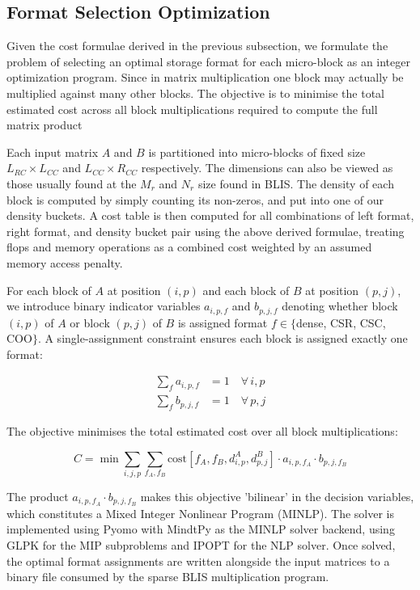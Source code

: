 \documentclass[sigconf, review, anonymous]{acmart}
\begin{document}
\subsection{Format Selection Optimization}

Given the cost formulae derived in the previous subsection, we formulate the problem of
selecting an optimal storage format for each micro-block as an integer optimization program.
Since in matrix multiplication one block may actually be multiplied against many other blocks.
The objective is to minimise the total estimated cost across all block multiplications
required to compute the full matrix product

Each input matrix $A$ and $B$ is partitioned into micro-blocks of fixed size
$L_{RC} \times L_{CC}$ and $L_{CC} \times R_{CC}$ respectively. The dimensions can also be viewed as those usually found at the $M_r$ and $N_r$ size found in BLIS. The density of each
block is computed by simply counting its non-zeros, and put into one of
our density buckets. A cost table is then computed for all combinations of left format,
right format, and density bucket pair using the above derived formulae, treating flops and
memory operations as a combined cost weighted by an assumed memory access penalty.

For each block of $A$ at position $(i, p)$ and each block of $B$ at position $(p, j)$,
we introduce binary indicator variables $a_{i,p,f}$ and $b_{p,j,f}$ denoting whether
block $(i,p)$ of $A$ or block $(p,j)$ of $B$ is assigned format $f \in \{$dense, CSR,
CSC, COO$\}$. A single-assignment constraint ensures each block is assigned exactly one
format:

\begin{align}
\sum_{f} a_{i,p,f} &= 1 \quad \forall\, i, p \\
\sum_{f} b_{p,j,f} &= 1 \quad \forall\, p, j
\end{align}

The objective minimises the total estimated cost over all block multiplications:

\begin{equation}
C = \min \sum_{i,j,p} \sum_{f_A, f_B}
    \text{cost}[f_A, f_B, d^A_{i,p}, d^B_{p,j}]
    \cdot a_{i,p,f_A} \cdot b_{p,j,f_B}
\end{equation}

The product $a_{i,p,f_A} \cdot b_{p,j,f_B}$ makes this objective 'bilinear' in the
decision variables, which constitutes a Mixed Integer Nonlinear
Program (MINLP). The solver is implemented using Pyomo \cite{pyomo} with MindtPy
\cite{mindtpy} as the MINLP solver backend, using GLPK \cite{glpk} for the MIP subproblems and
IPOPT \cite{ipopt} for the NLP solver. Once solved, the optimal format
assignments are written alongside the
input matrices to a binary file consumed by the sparse BLIS multiplication program.
\end{document}
